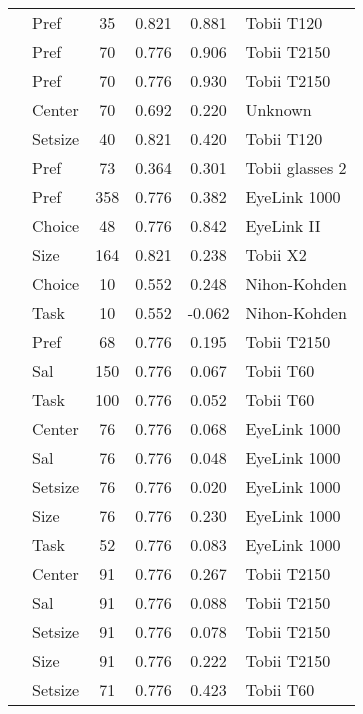 \begin{longtable}{p{8cm}lcccl}
  \cite{meissner2016a} & Pref & 35 & 0.821 & 0.881 & Tobii T120 \\ 
  \cite{meissner2016a} & Pref & 70 & 0.776 & 0.906 & Tobii T2150 \\ 
  \cite{meissner2016a} & Pref & 70 & 0.776 & 0.930 & Tobii T2150 \\ 
  \cite{meissner2016a} & Center & 70 & 0.692 & 0.220 & Unknown \\ 
  \cite{meissner2016b} & Setsize & 40 & 0.821 & 0.420 & Tobii T120 \\ 
  \cite{meyerding2018} & Pref & 73 & 0.364 & 0.301 & Tobii glasses 2 \\ 
  \cite{miller2015} & Pref & 358 & 0.776 & 0.382 & EyeLink 1000 \\ 
  \cite{mitsuda2014} & Choice & 48 & 0.776 & 0.842 & EyeLink II \\ 
  \cite{neuhofer2020} & Size & 164 & 0.821 & 0.238 & Tobii X2 \\ 
  \cite{nittono2009} & Choice & 10 & 0.552 & 0.248 & Nihon-Kohden \\ 
  \cite{nittono2009} & Task & 10 & 0.552 & -0.062 & Nihon-Kohden \\ 
  \cite{orquin2013} & Pref & 68 & 0.776 & 0.195 & Tobii T2150 \\ 
  \cite{orquin2015a} & Sal & 150 & 0.776 & 0.067 & Tobii T60 \\ 
  \cite{orquin2015a} & Task & 100 & 0.776 & 0.052 & Tobii T60 \\ 
  \cite{orquin2019a} & Center & 76 & 0.776 & 0.068 & EyeLink 1000 \\ 
  \cite{orquin2019a} & Sal & 76 & 0.776 & 0.048 & EyeLink 1000 \\ 
  \cite{orquin2019a} & Setsize & 76 & 0.776 & 0.020 & EyeLink 1000 \\ 
  \cite{orquin2019a} & Size & 76 & 0.776 & 0.230 & EyeLink 1000 \\ 
  \cite{orquin2019a} & Task & 52 & 0.776 & 0.083 & EyeLink 1000 \\ 
  \cite{orquin2019a} & Center & 91 & 0.776 & 0.267 & Tobii T2150 \\ 
  \cite{orquin2019a} & Sal & 91 & 0.776 & 0.088 & Tobii T2150 \\ 
  \cite{orquin2019a} & Setsize & 91 & 0.776 & 0.078 & Tobii T2150 \\ 
  \cite{orquin2019a} & Size & 91 & 0.776 & 0.222 & Tobii T2150 \\ 
  \cite{orquin2020osfb} & Setsize & 71 & 0.776 & 0.423 & Tobii T60 \\ 

\end{longtable}
